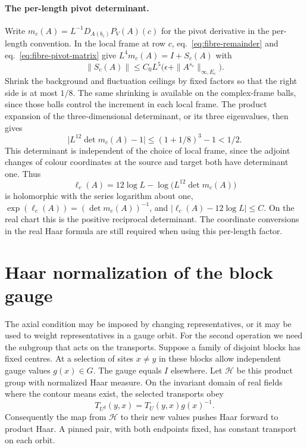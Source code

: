 \documentclass[11pt,letterpaper,reqno]{amsart}
\numberwithin{equation}{section}
\renewcommand{\eqref}[1]{\textup{eq.~\ref{#1}}}
\theoremstyle{definition}
\theoremstyle{remark}
\begin{document}
\paragraph{The per-length pivot determinant.}
Write
\(m_c(A)=L^{-1}D_{A(b_c)}P_V(A)(c)\) for the pivot derivative
in the per-length convention. In the local frame at row \(c\),
\eqref{eq:fibre-remainder} and \eqref{eq:fibre-pivot-matrix}
give \(L^4m_c(A)=I+S_c(A)\) with
\[
 \|S_c(A)\|\leq C_0L^5
       \bigl(\epsilon+\|A^{s_c}\|_{\infty,E_c}\bigr).
\]
Shrink the background and fluctuation ceilings by fixed factors
so that the right side is at most \(1/8\). The same shrinking is
available on the complex-frame balls, since those balls control
the increment in each local frame. The product expansion of the
three-dimensional determinant, or its three eigenvalues,
then gives
\begin{equation}\label{eq:fibre-retained-determinant}
 \bigl|L^{12}\det m_c(A)-1\bigr|
     \leq (1+1/8)^3-1<1/2 .
\end{equation}
This determinant is independent of the choice of local frame,
since the adjoint changes of colour coordinates at the source
and target both have determinant one. Thus
\[
 \ell_c(A)=12\log L-\log\bigl(L^{12}\det m_c(A)\bigr)
\]
is holomorphic with the series logarithm about one,
\(\exp(\ell_c(A))=(\det m_c(A))^{-1}\), and
\(|\ell_c(A)-12\log L|\leq C\).
On the real chart this is the positive reciprocal determinant.
The coordinate conversions in the real Haar formula are still
required when using this per-length factor.


\section{Haar normalization of the block gauge}\label{sec:soft-gauge}

The axial condition may be imposed by changing representatives, or
it may be used to weight representatives in a gauge orbit. For the
second operation we need the subgroup that acts on the transports.
Suppose a family of disjoint blocks has fixed centres. At a selection
of sites \(x\ne y\) in these blocks allow independent gauge values
\(g(x)\in G\). The gauge equals \(I\) elsewhere. Let \(\mathcal H\)
be this product group with normalized Haar measure. On the invariant
domain of real fields where the contour means exist, the selected transports obey
\[
 T_{U^g}(y,x)=T_U(y,x)g(x)^{-1}.
\]
Consequently the map from \(\mathcal H\) to their new values pushes
Haar forward to product Haar. A pinned pair, with both endpoints
fixed, has constant transport on each orbit.
\end{document}
